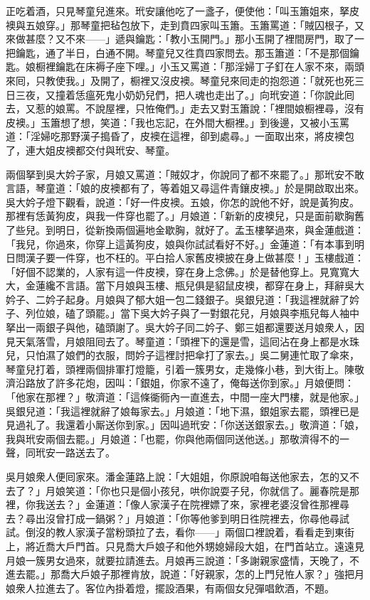 正吃着酒，只見琴童兒進來。玳安讓他吃了一盞子，便使他：「叫玉簫姐來，拏皮襖與五娘穿。」那琴童把毡包放下，走到賁四家叫玉簫。玉簫罵道：「賊囚根子，又來做甚麼？又不來——」遞與鑰匙：「教小玉開門。」那小玉開了裡間房門，取了一把鑰匙，通了半日，白通不開。琴童兒又徃賁四家問去。那玉簫道：「不是那個鑰匙。娘橱裡鑰匙在床褥子座下哩。」小玉又罵道：「那淫婦丁子釘在人家不來，兩頭來囘，只教使我。」及開了，橱裡又沒皮襖。琴童兒來囘走的抱怨道：「就死也死三日三夜，又撞着恁瘟死鬼小奶奶兒們，把人魂也走出了。」向玳安道：「你說此囘去，又惹的娘罵。不說屋裡，只恠俺們。」走去又對玉簫說：「裡間娘橱裡尋，沒有皮襖。」玉簫想了想，笑道：「我也忘記，在外間大橱裡。」到後邊，又被小玉罵道：「淫婦吃那野漢子搗昏了，皮襖在這裡，卻到處尋。」一面取出來，將皮襖包了，連大姐皮襖都交付與玳安、琴童。

兩個拏到吳大妗子家，月娘又罵道：「賊奴才，你說同了都不來罷了。」那玳安不敢言語，琴童道：「娘的皮襖都有了，等着姐又尋這件青鑲皮襖。」於是開啟取出來。吳大妗子燈下觀看，說道：「好一件皮襖。五娘，你怎的說他不好，說是黃狗皮。那裡有恁黃狗皮，與我一件穿也罷了。」月娘道：「新新的皮襖兒，只是面前歇胸舊了些兒。到明日，從新換兩個遍地金歇胸，就好了。孟玉樓拏過來，與金蓮戲道：「我兒，你過來，你穿上這黃狗皮，娘與你試試看好不好。」金蓮道：「有本事到明日問漢子要一件穿，也不枉的。平白拾人家舊皮襖披在身上做甚麼！」玉樓戲道：「好個不認業的，人家有這一件皮襖，穿在身上念佛。」於是替他穿上。見寬寬大大，金蓮纔不言語。當下月娘與玉樓、瓶兒俱是貂鼠皮襖，都穿在身上，拜辭吳大妗子、二妗子起身。月娘與了郁大姐一包二錢銀子。吳銀兒道：「我這裡就辭了妗子、列位娘，磕了頭罷。」當下吳大妗子與了一對銀花兒，月娘與李瓶兒每人袖中拏出一兩銀子與他，磕頭謝了。吳大妗子同二妗子、鄭三姐都還要送月娘衆人，因見天氣落雪，月娘阻囘去了。琴童道：「頭裡下的還是雪，這囘沾在身上都是水珠兒，只怕濕了娘們的衣服，問妗子這裡討把傘打了家去。」吳二舅連忙取了傘來，琴童兒打着，頭裡兩個排軍打燈籠，引着一簇男女，走幾條小巷，到大街上。陳敬濟沿路放了許多花炮，因叫：「銀姐，你家不遠了，俺每送你到家。」月娘便問：「他家在那裡？」敬濟道：「這條衚衕內一直進去，中間一座大門樓，就是他家。」吳銀兒道：「我這裡就辭了娘每家去。」月娘道：「地下濕，銀姐家去罷，頭裡已是見過礼了。我還着小厮送你到家。」因叫過玳安：「你送送銀家去。」敬濟道：「娘，我與玳安兩個去罷。」月娘道：「也罷，你與他兩個同送他送。」那敬濟得不的一聲，同玳安一路送去了。

吳月娘衆人便囘家來。潘金蓮路上說：「大姐姐，你原說咱每送他家去，怎的又不去了？」月娘笑道：「你也只是個小孩兒，哄你說耍子兒，你就信了。麗春院是那裡，你我送去？」金蓮道：「像人家漢子在院裡嫖了來，家裡老婆沒曾徃那裡尋去？尋出沒曾打成一鍋粥？」月娘道：「你等他爹到明日徃院裡去，你尋他尋試試。倒沒的教人家漢子當粉頭拉了去，看你——」兩個口裡說着，看看走到東街上，將近喬大戶門首。只見喬大戶娘子和他外甥媳婦段大姐，在門首站立。遠遠見月娘一簇男女過來，就要拉請進去。月娘再三說道：「多謝親家盛情，天晚了，不進去罷。」那喬大戶娘子那裡肯放，說道：「好親家，怎的上門兒恠人家？」強把月娘衆人拉進去了。客位內掛着燈，擺設酒果，有兩個女兒彈唱飲酒，不題。

